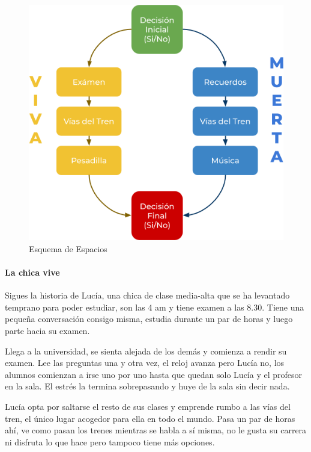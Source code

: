 \begin{figure}[h]
    \centering
    \includegraphics[scale=.6]{imgs/espacios.png}
    \caption{Esquema de Espacios}
    \label{fig:espacios}
\end{figure}

\vspace{.5cm}

\paragraph{La chica vive}
Sigues la historia de Lucía, una chica de clase media-alta que se ha levantado temprano para poder estudiar, son las 4 am y tiene examen a las 8.30. Tiene una pequeña conversación consigo misma, estudia durante un par de horas y luego parte hacia su examen.

Llega a la universidad, se sienta alejada de los demás y comienza a rendir su examen. Lee las preguntas una y otra vez, el reloj avanza pero Lucía no, los alumnos comienzan a irse uno por uno hasta que quedan solo Lucía y el profesor en la sala. El estrés la termina sobrepasando y huye de la sala sin decir nada.

Lucía opta por saltarse el resto de sus clases y emprende rumbo a las vías del tren, el único lugar acogedor para ella en todo el mundo. Pasa un par de horas ahí, ve como pasan los trenes mientras se habla a sí misma, no le gusta su carrera ni disfruta lo que hace pero tampoco tiene más opciones.

